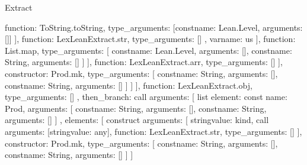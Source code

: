 \begin{lexlean}{Extract}
\begin{toolingmodule}
{{{{{{{{{{{{{{                                            function: ToString.toString,
                                            type_arguments: [const{name: Lean.Level, arguments: []}]
                                          }
                                        ],
                                        function: LexLeanExtract.str,
                                        type_arguments: []
                                      }
                                    },
                                    var{name: us}
                                  ],
                                  function: List.map,
                                  type_arguments: [
                                    const{name: Lean.Level, arguments: []},
                                    const{name: String, arguments: []}
                                  ]
                                }
                              ],
                              function: LexLeanExtract.arr,
                              type_arguments: []
                            }
                          ],
                          constructor: Prod.mk,
                          type_arguments: [
                            const{name: String, arguments: []},
                            const{name: String, arguments: []}
                          ]
                        }
                      ]
                    }
                  ],
                  function: LexLeanExtract.obj,
                  type_arguments: []
                },
                then_branch: call{
                  arguments: [
                    list{
                      element: const{
                        name: Prod,
                        arguments: [
                          const{name: String, arguments: []},
                          const{name: String, arguments: []}
                        ]
                      },
                      elements: [
                        construct{
                          arguments: [
                            string{value: kind},
                            call{
                              arguments: [string{value: any}],
                              function: LexLeanExtract.str,
                              type_arguments: []
                            }
                          ],
                          constructor: Prod.mk,
                          type_arguments: [
                            const{name: String, arguments: []},
                            const{name: String, arguments: []}
                          ]
                        }
                      ]
}}}}}}}}
\end{toolingmodule}
\end{lexlean}
